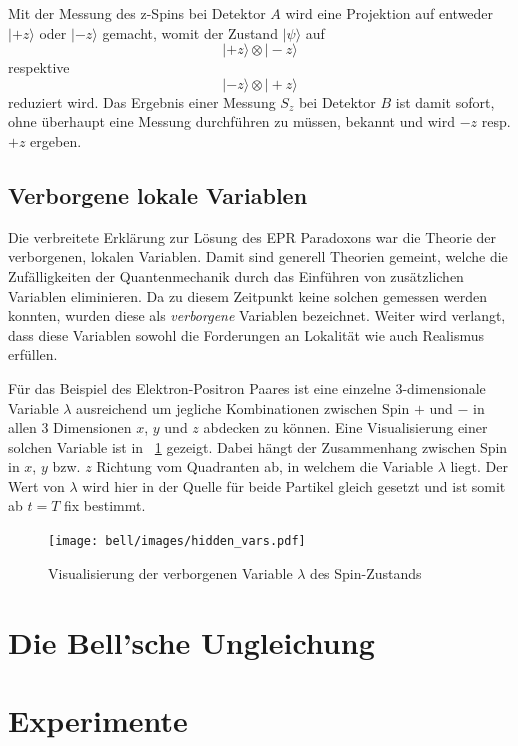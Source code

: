 \begin{refsection}
Mit der Messung des z-Spins bei Detektor $A$ wird eine Projektion auf
entweder $|{+}z\rangle$ oder $|{-}z\rangle$ gemacht, womit der Zustand
$|\psi\rangle$ auf
\[
    |{+}z\rangle \otimes |{-}z\rangle
\]
respektive
\[
    |{-}z\rangle \otimes |{+}z\rangle
\]
reduziert wird.
Das Ergebnis einer Messung $S_z$ bei Detektor $B$ ist damit sofort, 
ohne \"uberhaupt eine Messung durchf\"uhren zu m\"ussen, bekannt und wird
$-z$ resp. $+z$ ergeben.


\subsection{Verborgene lokale Variablen}
Die verbreitete Erkl\"arung zur L\"osung des EPR Paradoxons war die Theorie
der verborgenen, lokalen Variablen. Damit sind generell Theorien gemeint,
welche die Zuf\"alligkeiten der Quantenmechanik durch das Einf\"uhren von
zus\"atzlichen Variablen eliminieren. Da zu diesem Zeitpunkt keine solchen
gemessen werden konnten, wurden diese als \emph{verborgene}
Variablen bezeichnet. Weiter wird verlangt, dass diese Variablen sowohl
die Forderungen an Lokalit\"at wie auch Realismus erf\"ullen.

F\"ur das Beispiel des Elektron-Positron Paares ist eine 
einzelne 3-dimensionale Variable $\lambda$ ausreichend um jegliche
Kombinationen zwischen Spin $+$ und $-$ in allen 3 Dimensionen 
$x$, $y$ und $z$ abdecken zu k\"onnen.
Eine Visualisierung einer solchen Variable ist in
\figurename~\ref{fig:Bell:hidden_var} gezeigt. Dabei h\"angt der Zusammenhang
zwischen Spin in $x$, $y$ bzw. $z$ Richtung vom Quadranten ab, in welchem
die Variable $\lambda$ liegt. Der Wert von $\lambda$ wird hier in der Quelle
f\"ur beide Partikel gleich gesetzt und ist somit ab $t=T$ fix bestimmt.

\begin{figure}
    \centering
    \texttt{[image: bell/images/hidden\_vars.pdf]}
    \caption{Visualisierung der verborgenen Variable $\lambda$ des Spin-Zustands}
    \label{fig:Bell:hidden_var}
\end{figure}


\section{Die Bell'sche Ungleichung}


\section{Experimente}

\end{refsection}
